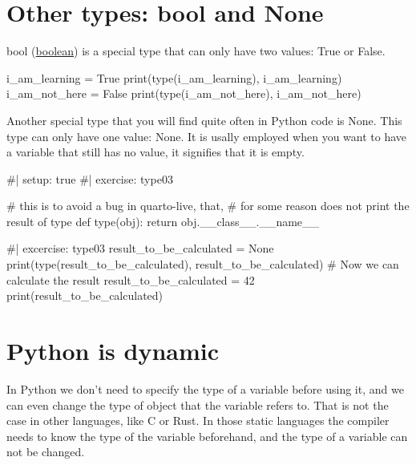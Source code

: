 \documentclass[
  letterpaper,
  DIV=11,
  numbers=noendperiod]{scrreprt}
\newenvironment{Shaded}{\begin{snugshade}}{\end{snugshade}}
\newcommand{\NormalTok}[1]{\textcolor[rgb]{0.00,0.23,0.31}{#1}}
\theoremstyle{remark}
\begin{document}
\section{Other types: bool and None}\label{other-types-bool-and-none}

bool (\href{https://en.wikipedia.org/wiki/Boolean_data_type}{boolean})
is a special type that can only have two values: True or False.

\begin{Shaded}
\begin{Highlighting}[]
\NormalTok{i\_am\_learning = True}
\NormalTok{print(type(i\_am\_learning), i\_am\_learning)}
\NormalTok{i\_am\_not\_here = False}
\NormalTok{print(type(i\_am\_not\_here), i\_am\_not\_here)}
\end{Highlighting}
\end{Shaded}

Another special type that you will find quite often in Python code is
None. This type can only have one value: None. It is usally employed
when you want to have a variable that still has no value, it signifies
that it is empty.

\begin{Shaded}
\begin{Highlighting}[]
\NormalTok{\#| setup: true}
\NormalTok{\#| exercise: type03}

\NormalTok{\# this is to avoid a bug in quarto{-}live, that,}
\NormalTok{\# for some reason does not print the result of type}
\NormalTok{def type(obj):}
\NormalTok{    return obj.\_\_class\_\_.\_\_name\_\_}
\end{Highlighting}
\end{Shaded}

\begin{Shaded}
\begin{Highlighting}[]
\NormalTok{\#| excercise: type03}
\NormalTok{result\_to\_be\_calculated = None}
\NormalTok{print(type(result\_to\_be\_calculated), result\_to\_be\_calculated)}
\NormalTok{\# Now we can calculate the result}
\NormalTok{result\_to\_be\_calculated = 42}
\NormalTok{print(result\_to\_be\_calculated)}
\end{Highlighting}
\end{Shaded}

\section{Python is dynamic}\label{python-is-dynamic}

In Python we don't need to specify the type of a variable before using
it, and we can even change the type of object that the variable refers
to. That is not the case in other languages, like C or Rust. In those
static languages the compiler needs to know the type of the variable
beforehand, and the type of a variable can not be changed.
\end{document}
